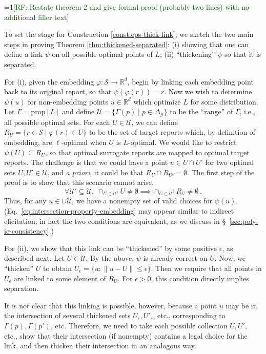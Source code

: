 \documentclass[twoside,11pt]{article}
\newcommand{\Comments}{1}
\newcommand{\mynote}[2]{\ifnum\Comments=1\textcolor{#1}{#2}\fi}
\newcommand{\raf}[1]{\mynote{darkgreen}{[RF: #1]}}
\newcommand{\reals}{\mathbb{R}}
\newcommand{\prop}[1]{\mathrm{prop}[#1]}
\newcommand{\simplex}{\Delta_\Y}
\newcommand{\Sc}{\mathcal{S}}
\newcommand{\U}{\mathcal{U}}
\newcommand{\Y}{\mathcal{Y}}
\begin{document}
\raf{Restate theorem 2 and give formal proof (probably two lines) with no additional filler text}

To set the stage for Construction \ref{const:eps-thick-link}, we sketch the two main steps in proving Theorem \ref{thm:thickened-separated}: (i) showing that one can define a link $\psi$ on all possible optimal points of $L$; (ii) ``thickening'' $\psi$ so that it is separated.

For (i), given the embedding $\varphi: \Sc\to\reals^d$, begin by linking each embedding point back to its original report, so that $\psi(\varphi(r)) = r$.
Now we wish to determine $\psi(u)$ for non-embedding points $u\in\reals^d$ which optimize $L$ for some distribution.
Let $\Gamma = \prop L$ and define $\U = \{\Gamma(p) \mid p\in\simplex\}$ to be the ``range'' of $\Gamma$, i.e., all possible optimal sets.
For each $U\in\U$, we can define $R_U = \{ r\in\Sc \mid \varphi(r) \in U\}$ to be the set of target reports which, by definition of embedding, are $\ell$-optimal when $U$ is $L$-optimal.
We would like to restrict $\psi(U) \subseteq R_U$, so that optimal surrogate reports are mapped to optimal target reports.
The challenge is that we could have a point $u\in U\cap U'$ for two optimal sets $U,U'\in\U$, and \emph{a priori}, it could be that $R_U \cap R_{U'} = \emptyset$.
The first step of the proof is to show that this scenario cannot arise.
\begin{equation}
  \label{eq:intersection-property-embedding}
  \forall \U'\subseteq\U, \; \cap_{U\in\U'} U \neq \emptyset \implies \cap_{U\in\U'} R_U \neq \emptyset~.
\end{equation}
\noindent
Thus, for any $u\in\cup\U$, we have a nonempty set of valid choices for $\psi(u)$.
(Eq.~\eqref{eq:intersection-property-embedding} may appear similar to indirect elicitation; in fact the two conditions are equivalent, as we discuss in \S~\ref{sec:poly-ie-consistency}.)

For (ii), we show that this link can be ``thickened'' by some positive $\epsilon$, as described next.
Let $U\in\U$.
By the above, $\psi$ is already correct on $U$.
Now, we ``thicken'' $U$ to obtain $U_{\epsilon} = \{u : \|u - U\| \leq \epsilon\}$.
Then we require that all points in $U_{\epsilon}$ are linked to some element of $R_U$.
For $\epsilon > 0$, this condition directly implies separation.

It is not clear that this linking is possible, however, because a point $u$ may be in the intersection of several thickened sets $U_{\epsilon}, U'_{\epsilon}$, etc., corresponding to $\Gamma(p), \Gamma(p')$, etc.
Therefore, we need to take each possible collection $U,U'$, etc., show that their intersection (if nonempty) contains a legal choice for the link, and then thicken their intersection in an analogous way.
\end{document}

